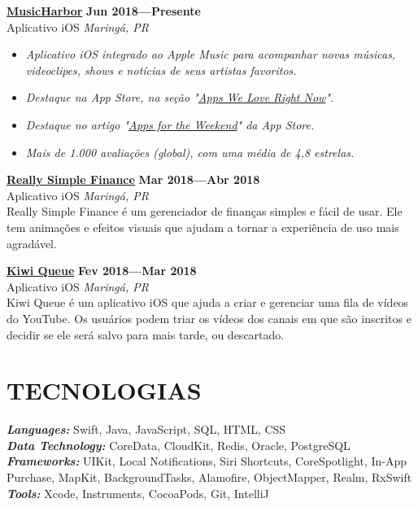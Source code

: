 \documentclass[line,margin]{res}
\begin{document}
\begin{resume}
  {\bf \href{https://apps.apple.com/us/app/musicharbor/id1440405750}{MusicHarbor}} \hfill {\bf Jun 2018---Presente} \\
  Aplicativo iOS \hfill {\sl Maring\'a, PR}\\[-6pt]
    \begin{itemize}
    \item {\sl Aplicativo iOS integrado ao Apple Music para acompanhar novas músicas, videoclipes, shows e notícias de seus artistas favoritos.}
    \item {\sl Destaque na App Store, na seção "\href{https://github.com/marcosatanaka/resume-latex/blob/master/images/apps_we_love_right_now.png?raw=true}{Apps We Love Right Now}".}
    \item {\sl Destaque no artigo "\href{https://apps.apple.com/us/story/id1516537723}{Apps for the Weekend}" da App Store.}
    \item {\sl Mais de 1.000 avaliações (global), com uma média de 4,8 estrelas.}
    \end{itemize}

  {\bf \href{https://itunes.apple.com/us/app/really-simple-finance/id1370859710}{Really Simple Finance}} \hfill {\bf Mar 2018---Abr 2018} \\
  Aplicativo iOS \hfill {\sl Maring\'a, PR}\\[6pt]
  Really Simple Finance é um gerenciador de finanças simples e fácil de usar. Ele tem animações e efeitos visuais que ajudam a tornar a experiência de uso mais agradável.

  {\bf \href{https://itunes.apple.com/us/app/kiwi-queue/id1352747116}{Kiwi Queue}} \hfill {\bf Fev 2018---Mar 2018} \\
  Aplicativo iOS \hfill {\sl Maring\'a, PR}\\[6pt]
  Kiwi Queue é um aplicativo iOS que ajuda a criar e gerenciar uma fila de vídeos do YouTube. Os usuários podem triar os vídeos dos canais em que são inscritos e decidir se ele será salvo para mais tarde, ou descartado.


\section{TECNOLOGIAS}
  {\sl {\bf Languages:}} Swift, Java, JavaScript, SQL, HTML, CSS \\
  {\sl {\bf Data Technology:}} CoreData, CloudKit, Redis, Oracle, PostgreSQL \\
  {\sl {\bf Frameworks:}} UIKit, Local Notifications, Siri Shortcuts, CoreSpotlight, In-App Purchase, MapKit, BackgroundTasks, Alamofire, ObjectMapper, Realm, RxSwift \\
  {\sl {\bf Tools:}} Xcode, Instruments, CocoaPods, Git, IntelliJ



\end{resume}
\end{document}
